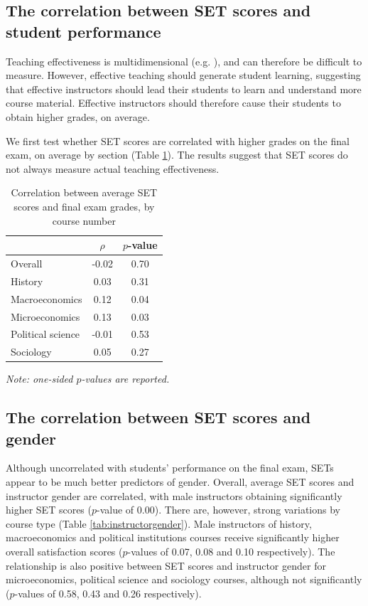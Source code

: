 \documentclass[12pt]{article}
\begin{document}
\subsection{The correlation between SET scores and student performance}

Teaching effectiveness is multidimensional (e.g. \citet{Marsh1997}), and can therefore be difficult to measure. However, effective teaching should generate student learning, suggesting that effective instructors should lead their students to learn and understand more course material. Effective instructors should therefore cause their students to obtain higher grades, on average. 

We first test whether SET scores are correlated with higher grades on the final exam, on average by section (Table \ref{tab:finalexam}). The results suggest that SET scores do not always measure actual teaching effectiveness. 

\begin{table}[htbp]
  \centering
  \footnotesize 
  \caption{Correlation between average SET scores and final exam grades, by course number}
    \begin{tabular}{lcc}
    \toprule 
                        & $\rho$  & $p$-value  \\
   \midrule
    Overall &            -0.02 &       0.70  \\
    History &             0.03 &       0.31  \\
    Macroeconomics &      0.12 &       0.04  \\
    Microeconomics &      0.13 &       0.03  \\
    Political science & -0.01 &       0.53  \\
    Sociology &           0.05 &       0.27  \\
    \bottomrule
    \end{tabular}%
 \label{tab:finalexam}%
 
  \textit{Note: one-sided $p$-values are reported.}
\end{table}%
\normalsize




\subsection{The correlation between SET scores and gender}


Although uncorrelated with students’ performance on the final exam, SETs appear to be much better predictors of gender. Overall, average SET scores and instructor gender are correlated, with male instructors obtaining significantly higher SET scores ($p$-value of 0.00). There are, however, strong variations by course type (Table \ref{tab:instructorgender}). Male instructors of history, macroeconomics and political institutions courses receive significantly higher overall satisfaction scores ($p$-values of 0.07, 0.08 and 0.10 respectively). The relationship is also positive between SET scores and instructor gender for microeconomics, political science and sociology courses, although not significantly ($p$-values of 0.58, 0.43 and 0.26 respectively).   
\end{document}
